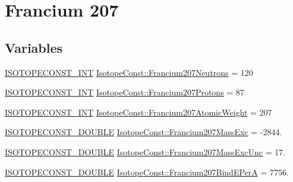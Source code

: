 \hypertarget{group___isotope_const-_francium-_fr207}{}\section{Francium 207}
\label{group___isotope_const-_francium-_fr207}
\subsection*{Variables}
\begin{DoxyCompactItemize}
\item 
\mbox{\hyperlink{group___isotope_const-_macros_ga5f18360b3e99483a35c32d789e62621c}{I\+S\+O\+T\+O\+P\+E\+C\+O\+N\+S\+T\+\_\+\+I\+NT}} \mbox{\hyperlink{group___isotope_const-_francium-_fr207_ga40148a842a52700617809f2070c6ce05}{Isotope\+Const\+::\+Francium207\+Neutrons}} = 120
\item 
\mbox{\hyperlink{group___isotope_const-_macros_ga5f18360b3e99483a35c32d789e62621c}{I\+S\+O\+T\+O\+P\+E\+C\+O\+N\+S\+T\+\_\+\+I\+NT}} \mbox{\hyperlink{group___isotope_const-_francium-_fr207_ga5584e4cce312ff8aa443e86b6ca2eb91}{Isotope\+Const\+::\+Francium207\+Protons}} = 87
\item 
\mbox{\hyperlink{group___isotope_const-_macros_ga5f18360b3e99483a35c32d789e62621c}{I\+S\+O\+T\+O\+P\+E\+C\+O\+N\+S\+T\+\_\+\+I\+NT}} \mbox{\hyperlink{group___isotope_const-_francium-_fr207_ga022393e65010da241bc395404fd5478c}{Isotope\+Const\+::\+Francium207\+Atomic\+Weight}} = 207
\item 
\mbox{\hyperlink{group___isotope_const-_macros_ga8f45a7272ce02c0b4c65c44636ed719a}{I\+S\+O\+T\+O\+P\+E\+C\+O\+N\+S\+T\+\_\+\+D\+O\+U\+B\+LE}} \mbox{\hyperlink{group___isotope_const-_francium-_fr207_gad07af3ba138f6140794e2d267827e579}{Isotope\+Const\+::\+Francium207\+Mass\+Exc}} = -\/2844.
\item 
\mbox{\hyperlink{group___isotope_const-_macros_ga8f45a7272ce02c0b4c65c44636ed719a}{I\+S\+O\+T\+O\+P\+E\+C\+O\+N\+S\+T\+\_\+\+D\+O\+U\+B\+LE}} \mbox{\hyperlink{group___isotope_const-_francium-_fr207_ga87d59580c3d74c77c4c852e4df0fae9b}{Isotope\+Const\+::\+Francium207\+Mass\+Exc\+Unc}} = 17.
\item 
\mbox{\hyperlink{group___isotope_const-_macros_ga8f45a7272ce02c0b4c65c44636ed719a}{I\+S\+O\+T\+O\+P\+E\+C\+O\+N\+S\+T\+\_\+\+D\+O\+U\+B\+LE}} \mbox{\hyperlink{group___isotope_const-_francium-_fr207_gaac69a9874039600371e1c3a16d88b7cb}{Isotope\+Const\+::\+Francium207\+Bind\+E\+PerA}} = 7756.
\item 

\end{DoxyCompactItemize}
